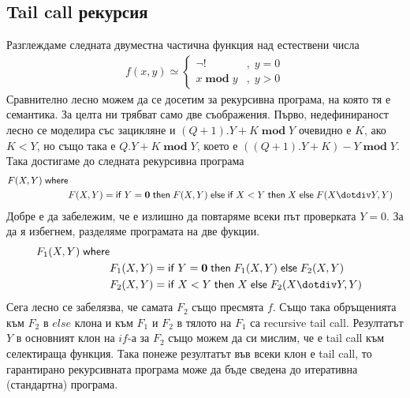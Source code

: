 \documentclass[14pt]{extarticle}
\begin{document}
\subsection*{Tail call рекурсия}
Разглеждаме следната двуместна частична функция над естествени числа
\begin{align*}
    f(x, y) \simeq \begin{cases}
    \lnot! &, \; y = 0 \\
    x \;\mathbf{mod}\; y &,\; y > 0
    \end{cases}
\end{align*}
Сравнително лесно можем да се досетим за рекурсивна програма, на която тя е семантика.
За целта ни трябват само две съображения. Първо, недефинираност лесно се моделира със зацикляне и \((Q + 1).Y + K \;\mathbf{mod}\; Y\) очевидно е \(K\), ако \(K < Y\), но също така е \(Q.Y + K \;\mathbf{mod}\; Y\), което е \(((Q + 1).Y + K) - Y \;\mathbf{mod}\; Y\).
Така достигаме до следната рекурсивна програма
\begin{align*}
    F(X,Y) \; \mathsf{where} \\
    & F(X, Y) = \mathsf{if} \; Y \;\mathbf{=}\; \mathbf 0 \; \mathsf{then} \; F(X, Y)  \; \mathsf{else} \; \mathsf{if} \; X \;\mathbf{<}\; Y \; \mathsf{then} \; X  \; \mathsf{else} \; F(X \dotdiv Y, Y)
\end{align*}
Добре е да забележим, че е излишно да повтаряме всеки път проверката \(Y = 0\). За да я избегнем, разделяме програмата на две фукции.
\begin{align*}
    F_1(X,Y) \; \mathsf{where} \\
    & F_1(X, Y) = \mathsf{if} \; Y \;\mathbf{=}\; \mathbf 0 \; \mathsf{then} \; F_1(X, Y)  \; \mathsf{else} \; F_2(X, Y) \\
    & F_2(X, Y) =  \mathsf{if} \; X \;\mathbf{<}\; Y \; \mathsf{then} \; X  \; \mathsf{else} \; F_2(X \dotdiv Y, Y)
\end{align*}
Сега лесно се забелязва, че самата \(F_2\) също пресмята \(f\).
Също така обръщенията към \(F_2\) в \(else\) клона и към \(F_1\) и \(F_2\) в тялото на \(F_1\) са recursive tail call.
Резултатът \(Y\) в основният клон на \(if\)-а за \(F_2\) също можем да си мислим, че е tail call към селектираща функция. Така понеже резултатът във всеки клон е tail call, то гарантирано рекурсивната програма може да бъде сведена до итеративна (стандартна) програма. \\
\end{document}
